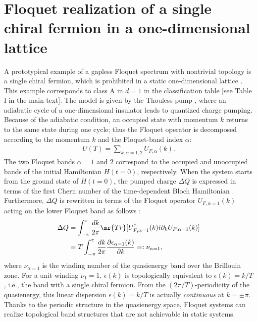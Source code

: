 \documentclass[
floatfix,
pra,
twocolumn,
reprint,
amsmath,amssymb,
aps,
footnote,
]{revtex4}
\begin{document}
\section{\label{sec: 1D}Floquet realization of a single chiral fermion in a one-dimensional lattice}
A prototypical example of a gapless Floquet spectrum with nontrivial topology is a single chiral fermion, which is prohibited in a static one-dimensional lattice \cite{NielsenNinomiya1, NielsenNinomiya2}.
This example corresponds to class A in $d=1$ in the classification table [see Table I in the main text].
The model is given by the Thouless pump \cite{Kitagawa10, Thouless83}, where an adiabatic cycle of a one-dimensional insulator leads to quantized charge pumping.
Because of the adiabatic condition,
an occupied state with momentum $k$ returns to the same state during one cycle; thus the Floquet operator is decomposed according to the momentum $k$ and the Floquet-band index $\alpha$:
\begin{align}
	U(T) = \sum_{k, \alpha = 1,2} U_{F, \alpha}(k)
	.
\end{align}
The two Floquet bands $\alpha = 1$ and $2$ correspond to the occupied and unoccupied bands of the initial Hamiltonian $H(t=0)$, respectively.
When the system starts from the ground state of $H(t=0)$, the pumped charge $\Delta Q$ is expressed in terms of the first Chern number of the time-dependent Bloch Hamiltonian \cite{Thouless83}.
Furthermore, $\Delta Q$ is rewritten in terms of the Floquet operator $U_{F, \alpha=1}(k)$ acting on the lower Floquet band as follows \cite{Kitagawa10}:
\begin{align}
	\Delta Q & =
	\int_{-\pi}^{\pi} {dk \over 2\pi}
	\mr{Tr}[U_{F, \alpha=1}^\dagger(k) i \partial_k U_{F, \alpha=1}(k)]
	\nonumber \\
	 & = T \int_{-\pi}^{\pi} {dk \over 2\pi}
	 {\partial \epsilon_{\alpha=1}(k) \over \partial k}
	 =: \nu_{\alpha=1}
	, \label{eq: fl, 2}
\end{align}
where $\nu_{\alpha=1}$ is the winding number of the quasienergy band over the Brillouin zone.
For a unit winding $\nu_1=1$, $\epsilon(k)$ is topologically equivalent to $\epsilon(k) = k/T$, i.e., the band with a single chiral fermion.
From the $(2\pi/T)$-periodicity of the quasienergy, this linear dispersion $\epsilon(k) = k/T$ is actually \textit{continuous} at $k=\pm\pi$.
Thanks to the periodic structure in the quasienergy space,
Floquet systems can realize topological band structures that are not achievable in static systems.
\end{document}
